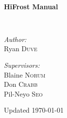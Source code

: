 \begin{titlepage}
\begin{center}
\HRule \\[0.4cm]
{ \huge \bfseries HiFrost Manual \\[0.4cm] }

\HRule \\[1.5cm]

\begin{minipage}{0.4\textwidth}
\begin{flushleft} \large
\emph{Author:}\\
Ryan \textsc{Duve}
\end{flushleft}
\end{minipage}
\begin{minipage}{0.4\textwidth}
\begin{flushright} \large
\emph{Supervisors:} \\
Blaine \textsc{Norum} \\
Don \textsc{Crabb} \\
Pil-Neyo \textsc{Seo}
\end{flushright}
\end{minipage}

\vfill

{\large Updated \today}

\end{center}
\end{titlepage}
